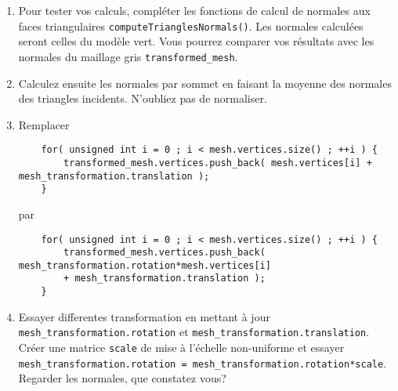 \documentclass[a4paper,10pt]{tp_um}
\newcommand\code[1]{\texttt{#1}}
\begin{document}
\begin{enumerate}
\item Pour tester vos calculs, compléter les fonctions de calcul de normales aux faces triangulaires \code{computeTrianglesNormals()}. Les normales calculées seront celles du modèle vert. Vous pourrez comparer vos résultats avec les normales du maillage gris \code{transformed_mesh}. 
\item Calculez ensuite les normales par sommet en faisant la moyenne des normales des triangles incidents. N'oubliez pas de normaliser.
\item Remplacer 
\begin{verbatim}
    for( unsigned int i = 0 ; i < mesh.vertices.size() ; ++i ) {
        transformed_mesh.vertices.push_back( mesh.vertices[i] + mesh_transformation.translation );
    }
\end{verbatim}
par 
\begin{verbatim}
    for( unsigned int i = 0 ; i < mesh.vertices.size() ; ++i ) {
        transformed_mesh.vertices.push_back( mesh_transformation.rotation*mesh.vertices[i] 
        + mesh_transformation.translation );
    }
\end{verbatim}

\item Essayer differentes transformation en mettant à jour  \code{mesh_transformation.rotation} et \code{mesh_transformation.translation}. 
Créer une matrice \code{scale} de mise à l'échelle non-uniforme et essayer \code{mesh_transformation.rotation = mesh_transformation.rotation*scale}. Regarder les normales, que constatez vous?

\end{enumerate}



\end{document}
